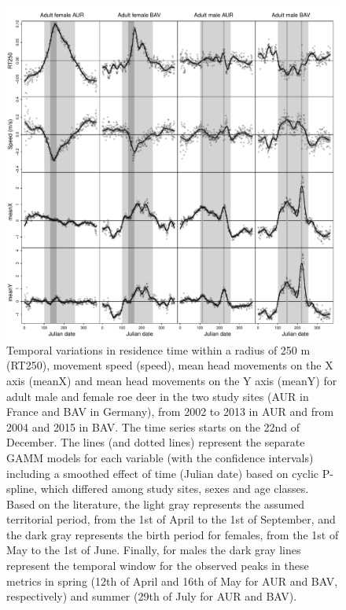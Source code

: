 \documentclass[a4paper,11pt]{article}
\begin{document}
\newpage
\begin{figure} [ht!]
  \centering
  \includegraphics[width=0.9\linewidth]{./figures/Fig2NB.pdf}
  \caption{Temporal variations in residence time within a radius of
    250 m (RT250), movement speed (speed), mean head movements on the
    X axis (meanX) and mean head movements on the Y axis (meanY) for
    adult male and female roe deer in the two study sites (AUR in
    France and BAV in Germany), from 2002 to 2013 in AUR and from 2004
    and 2015 in BAV. The time series starts on the 22nd of
    December. The lines (and dotted lines) represent the separate GAMM
    models for each variable (with the confidence intervals) including
    a smoothed effect of time (Julian date) based on cyclic P-spline,
    which differed among study sites, sexes and age classes. Based on
    the literature, the light gray represents the assumed territorial
    period, from the 1st of April to the 1st of September, and the
    dark gray represents the birth period for females, from the 1st of
    May to the 1st of June. Finally, for males the dark gray lines
    represent the temporal window for the observed peaks in these
    metrics in spring (12th of April and 16th of May for AUR and
    BAV, respectively) and summer (29th of July for AUR and BAV).}\label{fig:sex}
\end{figure}
\end{document}
